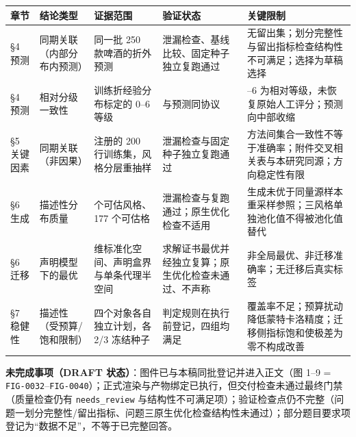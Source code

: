 \documentclass[11pt,a4paper]{article}
\begin{document}
{
\begin{longtable}[]{@{}
  >{\raggedright\arraybackslash}p{}
  >{\raggedright\arraybackslash}p{}
  >{\raggedright\arraybackslash}p{}
  >{\raggedright\arraybackslash}p{}
  >{\raggedright\arraybackslash}p{}@{}}
\toprule\noalign{}
\begin{minipage}[b]{\linewidth}\raggedright
章节
\end{minipage} & \begin{minipage}[b]{\linewidth}\raggedright
结论类型
\end{minipage} & \begin{minipage}[b]{\linewidth}\raggedright
证据范围
\end{minipage} & \begin{minipage}[b]{\linewidth}\raggedright
验证状态
\end{minipage} & \begin{minipage}[b]{\linewidth}\raggedright
关键限制
\end{minipage} \\
\midrule\noalign{}
\endhead
\bottomrule\noalign{}
\endlastfoot
§4 预测 & 同期关联（内部分布内预测） & 同一批 250 款啤酒的折外预测 &
泄漏检查、基线比较、固定种子独立复跑通过 &
无留出集；划分完整性与留出指标检查结构性不可满足；选择为草稿选择 \\
§4 预测 & 相对分级一致性 & 训练折经验分布标定的 0--6 等级 & 与预测同协议
& 0--6 为相对等级，未恢复原始人工评分；预测向中部收缩 \\
§5 关键因素 & 同期关联（非因果） & 注册的 200 行训练集，风格分层重抽样 &
泄漏检查与固定种子独立复跑通过 &
方法间集合一致性不等于准确率；附件交叉相关表与本研究同源；方向稳定性有限 \\
§6 生成 & 描述性分布质量 & 21 个可估风格、177 个可估格 &
泄漏检查与复跑通过；原生优化检查不适用 &
生成未优于同量源样本重采样参照；三风格单独池化值不得被池化值替代 \\
§6 迁移 & 声明模型下的最优 & 231 维标准化空间、声明盒界与单条代理半空间
& 求解证书最优并经独立复算；原生优化检查未通过、不声称 &
非全局最优、非迁移准确率；无迁移后真实标签 \\
§7 稳健性 & 描述性（受预算/饱和限制） & 四个对象各自独立计划，各 2/3
冻结种子 & 判定规则在执行前登记，四组均满足 &
覆盖率不足；预算扰动降低蒙特卡洛精度；迁移侧指标饱和使极差为零不构成改善 \\
\end{longtable}
}

\textbf{未完成事项（DRAFT 状态）}：图件已与本稿同批登记并进入正文（图
1--9 =
\texttt{FIG-0032}--\texttt{FIG-0040}）；正式渲染与产物绑定已执行，但交付检查未通过最终门禁（质量检查仍有
\texttt{needs\_review}
与结构性不可满足项）；验证检查点仍不完整（问题一划分完整性/留出指标、问题三原生优化检查结构性未通过）；部分题目要求项登记为``数据不足''，不等于已完整回答。
\end{document}
